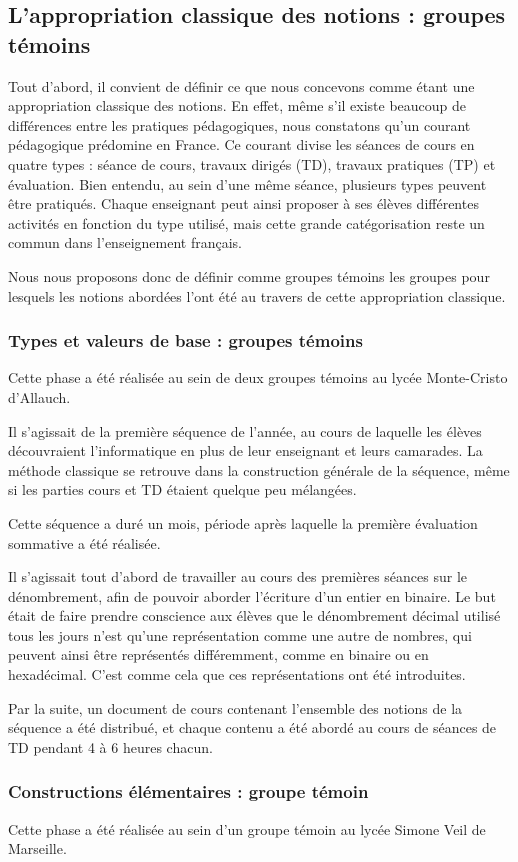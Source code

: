 
\subsection{L'appropriation \og classique \fg{} des notions : groupes témoins}

Tout d'abord, il convient de définir ce que nous concevons comme étant une appropriation \og classique \fg{} des notions. En effet, même s'il existe beaucoup de différences entre les pratiques pédagogiques, nous constatons qu'un courant pédagogique prédomine en France. Ce courant divise les séances de cours en quatre types : séance de cours, travaux dirigés (TD), travaux pratiques (TP) et évaluation. Bien entendu, au sein d'une même séance, plusieurs types peuvent être pratiqués. Chaque enseignant peut ainsi proposer à ses élèves différentes activités en fonction du type utilisé, mais cette grande catégorisation reste un commun dans l'enseignement français.

Nous nous proposons donc de définir comme groupes témoins les groupes pour lesquels les notions abordées l'ont été au travers de cette appropriation classique.


\subsubsection{Types et valeurs de base : groupes témoins}
Cette phase a été réalisée au sein de deux groupes témoins au lycée Monte-Cristo d'Allauch.

Il s'agissait de la première séquence de l'année, au cours de laquelle les élèves découvraient l'informatique en plus de leur enseignant et leurs camarades. La méthode \og classique \fg{} se retrouve dans la construction générale de la séquence, même si les parties cours et TD étaient quelque peu mélangées.

Cette séquence a duré un mois, période après laquelle la première évaluation sommative a été réalisée.

Il s'agissait tout d'abord de travailler au cours des premières séances sur le dénombrement, afin de pouvoir aborder l'écriture d'un entier en binaire. Le but était de faire prendre conscience aux élèves que le dénombrement décimal utilisé tous les jours n'est qu'une représentation comme une autre de nombres, qui peuvent ainsi être représentés différemment, comme en binaire ou en hexadécimal. C'est comme cela que ces représentations ont été introduites.

Par la suite, un document de cours contenant l'ensemble des notions de la séquence a été distribué, et chaque contenu a été abordé au cours de séances de TD pendant 4 à 6 heures chacun.

\subsubsection{Constructions élémentaires : groupe témoin}
Cette phase a été réalisée au sein d'un groupe témoin au lycée Simone Veil de Marseille.